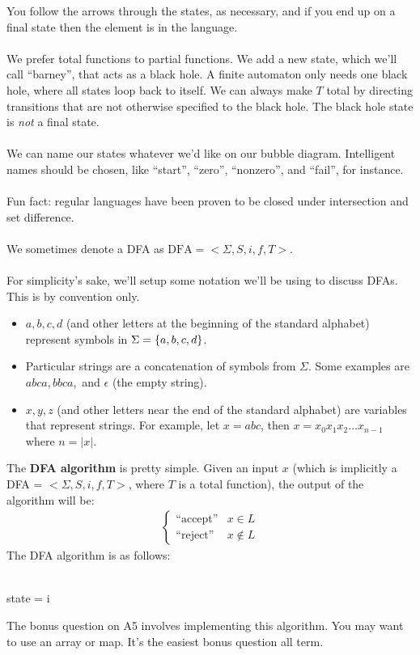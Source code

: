 \documentclass[]{article}
\DeclarePairedDelimiter{\set}{\lbrace}{\rbrace}
\theoremstyle{definition}
\newcommand{\lecture}[1]{\marginpar{{\footnotesize $\leftarrow$ \underline{#1}}}}
\begin{document}
			You follow the arrows through the states, as necessary, and if you end up on a final state then the element is in the language.
			\\ \\
			We prefer total functions to partial functions. We add a new state, which we'll call ``barney'', that acts as a black hole. A finite automaton only needs one black hole, where all states loop back to itself. We can always make $T$ total by directing transitions that are not otherwise specified to the black hole. The black hole state is \emph{not} a final state.
			\\ \\
			We can name our states whatever we'd like on our bubble diagram. Intelligent names should be chosen, like ``start'', ``zero'', ``nonzero'', and ``fail'', for instance.
			\\ \\
			Fun fact: regular languages have been proven to be closed under intersection and set difference. \lecture{February 6, 2013}
			\\ \\
			We sometimes denote a DFA as $\text{DFA} = < \Sigma, S, i, f, T >$.
			\\ \\
			For simplicity's sake, we'll setup some notation we'll be using to discuss DFAs. This is by convention only.
			\begin{itemize}
				\item $a, b, c, d$ (and other letters at the beginning of the standard alphabet) represent symbols in $\Sigma = \set{a, b, c, d}$.
				\item Particular strings are a concatenation of symbols from $\Sigma$. Some examples are $abca, bbca,$ and $\epsilon$ (the empty string).
				\item $x, y, z$ (and other letters near the end of the standard alphabet) are variables that represent strings. For example, let $x = abc$, then $x = x_0 x_1 x_2 \ldots x_{n - 1}$ where $n = |x|$.
			\end{itemize}
			The \textbf{DFA algorithm} is pretty simple. Given an input $x$ (which is implicitly a DFA = $< \Sigma, S, i, f, T >$, where $T$ is a total function), the output of the algorithm will be:
			\begin{align*}
				\begin{cases}
					\text{``accept''} & x \in L \\
					\text{``reject''} & x \not \in L
				\end{cases}
			\end{align*}
			The DFA algorithm is as follows: \\ \\
			\begin{algorithm}[H]
				state = i\;
			\end{algorithm}
			\vspace{0.5cm}
			The bonus question on A5 involves implementing this algorithm. You may want to use an array or map. It's the easiest bonus question all term.
\end{document}
